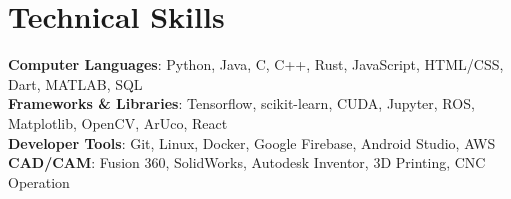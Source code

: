 \documentclass[letterpaper,11pt]{article}
\begin{document}
%
\section{Technical Skills}
 \begin{itemize}[leftmargin=0.15in, label={}]
    \small{\item{
     \textbf{Computer Languages}{: Python, Java, C, C++, Rust, JavaScript, HTML/CSS, Dart, MATLAB, SQL} \\
     \textbf{Frameworks \& Libraries}{: Tensorflow, scikit-learn, CUDA, Jupyter, ROS, Matplotlib, OpenCV, ArUco, React} \\
     \textbf{Developer Tools}{: Git, Linux, Docker, Google Firebase, Android Studio, AWS} \\
     \textbf{CAD/CAM}{: Fusion 360, SolidWorks, Autodesk Inventor, 3D Printing, CNC Operation} \\
    }}
 \end{itemize}


\end{document}
